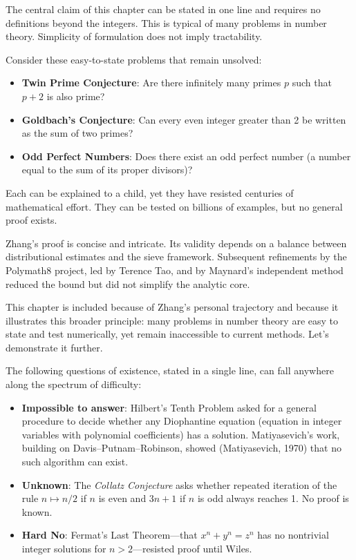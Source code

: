 \begin{commentary}
The central claim of this chapter can be stated in one line and requires no definitions beyond the integers. This is typical of many problems in number theory. Simplicity of formulation does not imply tractability.

Consider these easy-to-state problems that remain unsolved:
\begin{itemize}
\item \textbf{Twin Prime Conjecture}: Are there infinitely many primes $p$ such that $p+2$ is also prime?
\item \textbf{Goldbach's Conjecture}: Can every even integer greater than 2 be written as the sum of two primes?
\item \textbf{Odd Perfect Numbers}: Does there exist an odd perfect number (a number equal to the sum of its proper divisors)?
\end{itemize}

Each can be explained to a child, yet they have resisted centuries of mathematical effort. They can be tested on billions of examples, but no general proof exists.

Zhang's proof is concise and intricate. Its validity depends on a balance between distributional estimates and the sieve framework. Subsequent refinements by the Polymath8 project, led by Terence Tao, and by Maynard's independent method reduced the bound but did not simplify the analytic core.

This chapter is included because of Zhang's personal trajectory and because it illustrates this broader principle: many problems in number theory are easy to state and test numerically, yet remain inaccessible to current methods. Let's demonstrate it further.

The following questions of existence, stated in a single line, can fall anywhere along the spectrum of difficulty:

\begin{itemize}
\item \textbf{Impossible to answer}: Hilbert's Tenth Problem asked for a general procedure to decide whether any Diophantine equation (equation in integer variables with polynomial coefficients) has a solution. Matiyasevich's work, building on Davis–Putnam–Robinson, showed (Matiyasevich, 1970) that no such algorithm can exist.
\item \textbf{Unknown}: The \textit{Collatz Conjecture} asks whether repeated iteration of the rule $n \mapsto n/2$ if $n$ is even and $3n+1$ if $n$ is odd always reaches 1. No proof is known.
\item \textbf{Hard No}: Fermat’s Last Theorem—that $x^n+y^n=z^n$ has no nontrivial integer solutions for $n>2$—resisted proof until Wiles.
\end{itemize}

\end{commentary}
